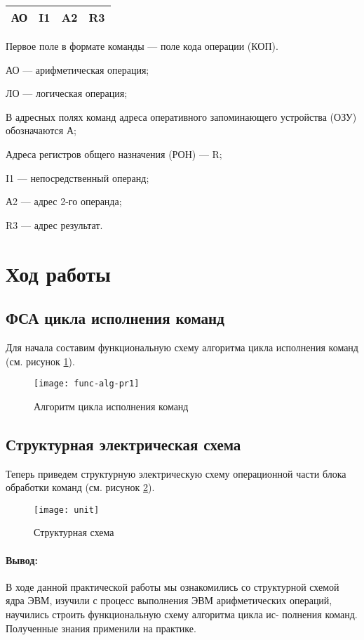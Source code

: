\documentclass[a4paper,14pt]{extarticle}
\begin{document}
\begin{center}
	\begin{tabular}{|c|c|c|c|}
	\hline
	АО & I1 &A2 &R3  \\
	\hline
\end{tabular}
\end{center}

Первое поле в формате команды — поле кода операции (КОП).

АО — арифметическая операция;

ЛО — логическая операция;

В адресных полях команд адреса оперативного запоминающего устройства (ОЗУ) обозначаются А;

Адреса регистров общего назначения (РОН) — R;

I1 — непосредственный операнд;

А2 — адрес 2-го операнда;

R3 — адрес результат.



\section*{Ход работы}




\subsection*{ФСА цикла исполнения команд}

Для начала составим функциональную схему алгоритма цикла исполнения команд (см. рисунок \ref{fig:func-alg}).


\begin{figure}[htbp]
	\centering
	\texttt{[image: func-alg-pr1]}
	\caption{Алгоритм цикла исполнения команд}
	\label{fig:func-alg}
\end{figure}
\newpage

\subsection*{Структурная электрическая схема}
Теперь приведем структурную электрическую схему операционной части блока обработки команд (см. рисунок \ref{fig:unit}).
\begin{figure}[htpb]
	\centering
	\texttt{[image: unit]}
	\caption{Структурная схема}
	\label{fig:unit}
\end{figure}


\paragraph{Вывод:}
В ходе данной практической работы мы ознакомились со структурной
схемой ядра ЭВМ, изучили с процесс выполнения ЭВМ арифметических
операций, научились строить функциональную схему алгоритма цикла ис-
полнения команд. Полученные знания применили на практике.
\end{document}
